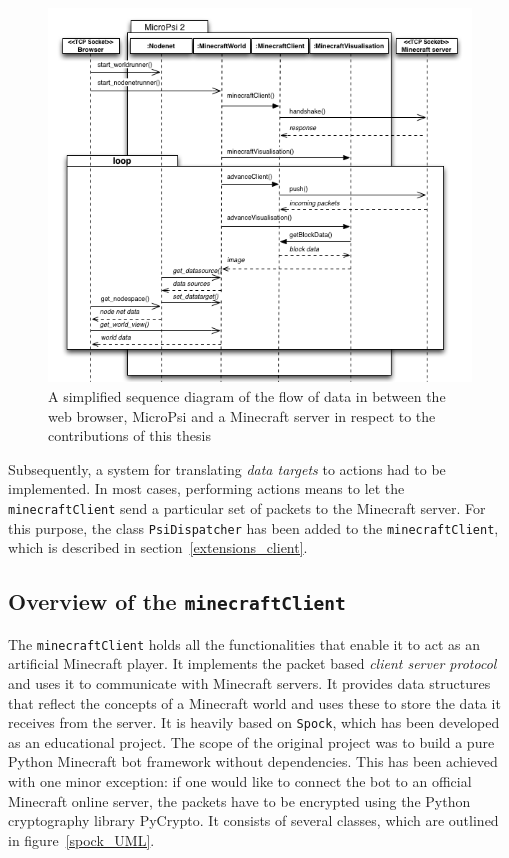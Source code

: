 \begin{figure}[h]
  \centering
    \includegraphics[width=15cm]{graphics/sequencediagram_v14}
  \caption{A simplified sequence diagram of the flow of data in between the web browser, MicroPsi and a Minecraft server in respect to the contributions of this thesis}
  \label{spock_loop}
\end{figure}

Subsequently, a system for translating \emph{data targets} to actions had to be implemented. In most cases, performing actions means to let the \texttt{minecraftClient} send a particular set of packets to the Minecraft server. For this purpose, the class \texttt{PsiDispatcher} has been added to the \texttt{minecraftClient}, which is described in section~\ref{extensions_client}.


        \subsection{Overview of the \texttt{minecraftClient}}
The \texttt{minecraftClient} holds all the functionalities that enable it to act as an artificial Minecraft player. It implements the packet based \emph{client server protocol} and uses it to communicate with Minecraft servers. It provides data structures that reflect the concepts of a Minecraft world and uses these to store the data it receives from the server. It is heavily based on \texttt{Spock}, which has been developed as an educational project. The scope of the original project was to build a pure Python Minecraft bot framework without dependencies. This has been achieved with one minor exception: if one would like to connect the bot to an official Minecraft online server, the packets have to be encrypted using the Python cryptography library PyCrypto. It consists of several classes, which are outlined in figure~\ref{spock_UML}.


